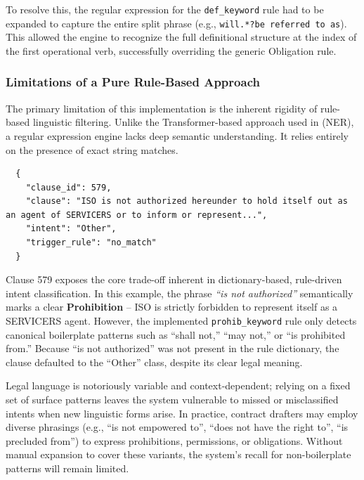 \documentclass[twoside,final]{hcmut-report}
\newcommand{\result}[1]{\fcolorbox{red}{white}{#1}}
\begin{document}
\medskip

To resolve this, the regular expression for the \texttt{def\_keyword} rule had to be expanded to capture the entire split phrase (e.g., \texttt{will.*?be referred to as}). This allowed the engine to recognize the full definitional structure at the index of the first operational verb, successfully overriding the generic Obligation rule.

\subsubsection*{Limitations of a Pure Rule-Based Approach}
The primary limitation of this implementation is the inherent rigidity of rule-based linguistic filtering. Unlike the Transformer-based approach used in \result{Section~\ref{task_2.1}} (NER), a regular expression engine lacks deep semantic understanding. It relies entirely on the presence of exact string matches.

\begin{verbatim}
  {
    "clause_id": 579,
    "clause": "ISO is not authorized hereunder to hold itself out as an agent of SERVICERS or to inform or represent...",
    "intent": "Other",
    "trigger_rule": "no_match"
  }
\end{verbatim}

Clause 579 exposes the core trade-off inherent in dictionary-based, rule-driven intent classification. In this example, the phrase \emph{``is not authorized''} semantically marks a clear \textbf{Prohibition} -- ISO is strictly forbidden to represent itself as a SERVICERS agent. However, the implemented \texttt{prohib\_keyword} rule only detects canonical boilerplate patterns such as ``shall not,'' ``may not,'' or ``is prohibited from.'' Because ``is not authorized'' was not present in the rule dictionary, the clause defaulted to the ``Other'' class, despite its clear legal meaning.

\medskip

Legal language is notoriously variable and context-dependent; relying on a fixed set of surface patterns leaves the system vulnerable to missed or misclassified intents when new linguistic forms arise. In practice, contract drafters may employ diverse phrasings (e.g., ``is not empowered to'', ``does not have the right to'', ``is precluded from'') to express prohibitions, permissions, or obligations. Without manual expansion to cover these variants, the system's recall for non-boilerplate patterns will remain limited.
\end{document}
